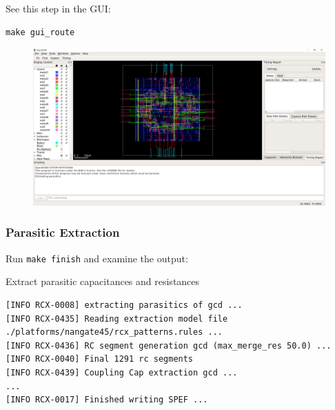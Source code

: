\documentclass[a4paper,12pt,twoside]{article}
\begin{document}
See this step in the GUI:
\begin{verbatim}
make gui_route
\end{verbatim}
\begin{figure}[H]
    \centering
    \includegraphics[width=\textwidth]{images/4.png}
\end{figure}
\subsubsection{Parasitic Extraction}
Run \texttt{make finish} and examine the output:

Extract parasitic capacitances and resistances
\begin{verbatim}
[INFO RCX-0008] extracting parasitics of gcd ...
[INFO RCX-0435] Reading extraction model file ./platforms/nangate45/rcx_patterns.rules ...
[INFO RCX-0436] RC segment generation gcd (max_merge_res 50.0) ...
[INFO RCX-0040] Final 1291 rc segments
[INFO RCX-0439] Coupling Cap extraction gcd ...
...
[INFO RCX-0017] Finished writing SPEF ...
\end{verbatim}
\end{document}
